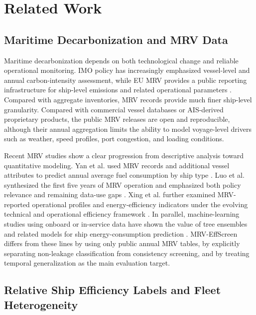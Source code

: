 \documentclass[preprints,article,submit,pdftex,oneauthor]{Definitions/mdpi}
\begin{document}
\section{Related Work}

\subsection{Maritime Decarbonization and MRV Data}

Maritime decarbonization depends on both technological change and reliable operational monitoring. IMO policy has increasingly emphasized vessel-level and annual carbon-intensity assessment, while EU MRV provides a public reporting infrastructure for ship-level emissions and related operational parameters \cite{emsa_thetis_mrv,ec_2024_mrv_report,imo_2023_ghg_strategy,regulation_eu_2023_957}. Compared with aggregate inventories, MRV records provide much finer ship-level granularity. Compared with commercial vessel databases or AIS-derived proprietary products, the public MRV releases are open and reproducible, although their annual aggregation limits the ability to model voyage-level drivers such as weather, speed profiles, port congestion, and loading conditions.

Recent MRV studies show a clear progression from descriptive analysis toward quantitative modeling. Yan et al. used MRV records and additional vessel attributes to predict annual average fuel consumption by ship type \cite{yan2023mrv_energy_efficiency}. Luo et al. synthesized the first five years of MRV operation and emphasized both policy relevance and remaining data-use gaps \cite{luo2024mrv_review}. Xing et al. further examined MRV-reported operational profiles and energy-efficiency indicators under the evolving technical and operational efficiency framework \cite{xing2025mrv_efficiency_framework}. In parallel, machine-learning studies using onboard or in-service data have shown the value of tree ensembles and related models for ship energy-consumption prediction \cite{fan2024ship_energy_ml}. MRV-EffScreen differs from these lines by using only public annual MRV tables, by explicitly separating non-leakage classification from consistency screening, and by treating temporal generalization as the main evaluation target.

\subsection{Relative Ship Efficiency Labels and Fleet Heterogeneity}
\end{document}
